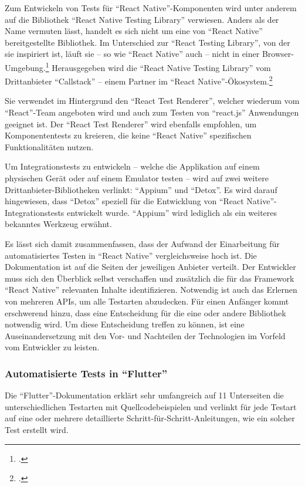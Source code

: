 Zum Entwickeln von Tests für \enquote{React Native}-Komponenten wird unter anderem auf die Bibliothek \enquote{React Native Testing Library} verwiesen.
Anders als der Name vermuten lässt, handelt es sich nicht um eine von \enquote{React Native} bereitgestellte Bibliothek.
Im Unterschied zur \enquote{React Testing Library}, von der sie inspiriert ist, läuft sie -- so wie \enquote{React Native} auch -- nicht in einer Browser-Umgebung.\footcite[Vgl.][]{NativeTestingLibraryIntroduction}
Herausgegeben wird die \enquote{React Native Testing Library} vom Drittanbieter \enquote{Callstack} -- einem Partner im \enquote{React Native}-Ökosystem.\footcite[Vgl.][]{TheReactNativeEcosystem}

Sie verwendet im Hintergrund den \enquote{React Test Renderer}, welcher wiederum vom \enquote{React}-Team angeboten wird und auch zum Testen von \enquote{react.js} Anwendungen geeignet ist.
Der \enquote{React Test Renderer} wird ebenfalls empfohlen, um Komponententests zu kreieren, die keine \enquote{React Native} spezifischen Funktionalitäten nutzen.

Um Integrationstests zu entwickeln -- welche die Applikation auf einem physischen Gerät oder auf einem Emulator testen -- wird auf zwei weitere Drittanbieter-Bibliotheken verlinkt:
\enquote{Appium} und \enquote{Detox}.
Es wird darauf hingewiesen, dass \enquote{Detox} speziell für die Entwicklung von \enquote{React Native}-Integrationstests entwickelt wurde.
\enquote{Appium} wird lediglich als ein weiteres bekanntes Werkzeug erwähnt.

Es lässt sich damit zusammenfassen, dass der Aufwand der Einarbeitung für automatisiertes Testen in \enquote{React Native} vergleichsweise hoch ist.
Die Dokumentation ist auf die Seiten der jeweiligen Anbieter verteilt.
Der Entwickler muss sich den Überblick selbst verschaffen und zusätzlich die für das Framework \enquote{React Native} relevanten Inhalte identifizieren.
Notwendig ist auch das Erlernen von mehreren APIs, um alle Testarten abzudecken.
Für einen Anfänger kommt erschwerend hinzu, dass eine Entscheidung für die eine oder andere Bibliothek notwendig wird.
Um diese Entscheidung treffen zu können, ist eine Auseinandersetzung mit den Vor- und Nachteilen der Technologien im Vorfeld vom Entwickler zu leisten.

\subsubsection{Automatisierte Tests in \enquote{Flutter}}
Die \enquote{Flutter}-Dokumentation erklärt sehr umfangreich auf 11 Unterseiten die unterschiedlichen Testarten mit Quellcodebeispielen
und verlinkt für jede Testart auf eine oder mehrere detaillierte Schritt-für-Schritt-Anleitungen,
wie ein solcher Test erstellt wird.


